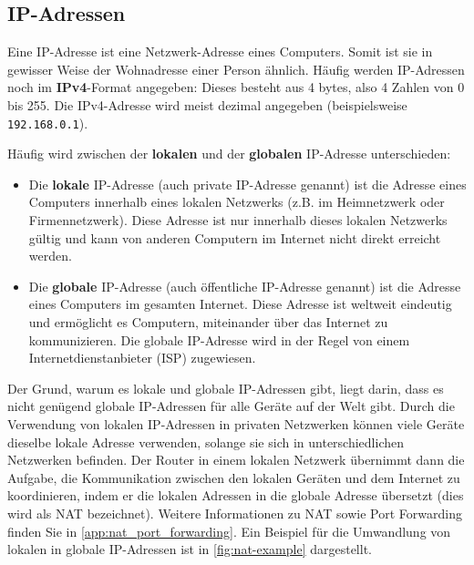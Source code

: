\subsection{IP-Adressen}

Eine \acrfull{IP}-Adresse ist eine Netzwerk-Adresse eines Computers. Somit ist sie in gewisser Weise der Wohnadresse einer Person ähnlich. Häufig werden \gls{IP}-Adressen noch im \textbf{IPv4}-Format angegeben: Dieses besteht aus 4 bytes, also 4 Zahlen von 0 bis 255. Die \gls{IP}v4-Adresse wird meist dezimal angegeben (beispielsweise \texttt{192.168.0.1}).

Häufig wird zwischen der \textbf{lokalen} und der \textbf{globalen} \gls{IP}-Adresse unterschieden:
\begin{itemize}
	\item Die \textbf{lokale} \gls{IP}-Adresse (auch private \gls{IP}-Adresse genannt) ist die Adresse eines Computers innerhalb eines lokalen Netzwerks (z.B. im Heimnetzwerk oder Firmennetzwerk). Diese Adresse ist nur innerhalb dieses lokalen Netzwerks gültig und kann von anderen Computern im Internet nicht direkt erreicht werden.
	\item Die \textbf{globale} \gls{IP}-Adresse (auch öffentliche \gls{IP}-Adresse genannt) ist die Adresse eines Computers im gesamten Internet. Diese Adresse ist weltweit eindeutig und ermöglicht es Computern, miteinander über das Internet zu kommunizieren. Die globale \gls{IP}-Adresse wird in der Regel von einem Internetdienstanbieter (\gls{ISP}) zugewiesen.
\end{itemize}

Der Grund, warum es lokale und globale \gls{IP}-Adressen gibt, liegt darin, dass es nicht genügend globale \gls{IP}-Adressen für alle Geräte auf der Welt gibt. Durch die Verwendung von lokalen \gls{IP}-Adressen in privaten Netzwerken können viele Geräte dieselbe lokale Adresse verwenden, solange sie sich in unterschiedlichen Netzwerken befinden. Der Router in einem lokalen Netzwerk übernimmt dann die Aufgabe, die Kommunikation zwischen den lokalen Geräten und dem Internet zu koordinieren, indem er die lokalen Adressen in die globale Adresse übersetzt (dies wird als \gls{NAT} bezeichnet). Weitere Informationen zu \gls{NAT} sowie Port Forwarding finden Sie in \cref{app:nat_port_forwarding}. Ein Beispiel für die Umwandlung von lokalen in globale \gls{IP}-Adressen ist in \cref{fig:nat-example} dargestellt.

